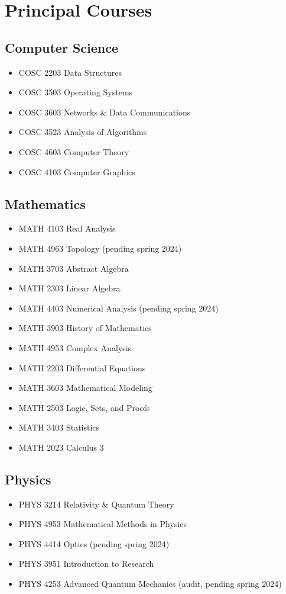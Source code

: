 \documentclass[a4paper, 11pt]{article}
\begin{document}
    \section*{Principal Courses}\label{sec:principal_courses}
    \subsection*{Computer Science}\label{sec:cs_courses}
    \begin{itemize}
        \item COSC 2203 Data Structures
        \item COSC 3503 Operating Systems
        \item COSC 3603 Networks \& Data Communications
        \item COSC 3523 Analysis of Algorithms
        \item COSC 4603 Computer Theory
        \item COSC 4103 Computer Graphics
    \end{itemize}
    \subsection*{Mathematics}\label{sec:math_courses}
    \begin{itemize}
        \item MATH 4103 Real Analysis
        \item MATH 4963 Topology \hfill(pending spring 2024)
        \item MATH 3703 Abstract Algebra
        \item MATH 2303 Linear Algebra
        \item MATH 4403 Numerical Analysis \hfill(pending spring 2024)
        \item MATH 3903 History of Mathematics
        \item MATH 4953 Complex Analysis
        \item MATH 2203 Differential Equations
        \item MATH 3603 Mathematical Modeling
        \item MATH 2503 Logic, Sets, and Proofs
        \item MATH 3403 Statistics
        \item MATH 2023 Calculus 3
    \end{itemize}
    \subsection*{Physics}\label{sec:physics_courses}
    \begin{itemize}
        \item PHYS 3214 Relativity \& Quantum Theory
        \item PHYS 4953 Mathematical Methods in Physics
        \item PHYS 4414 Optics \hfill(pending spring 2024)
        \item PHYS 3951 Introduction to Research
        \item PHYS 4253 Advanced Quantum Mechanics \hfill(audit, pending spring 2024)
    \end{itemize}
    
\end{document}
